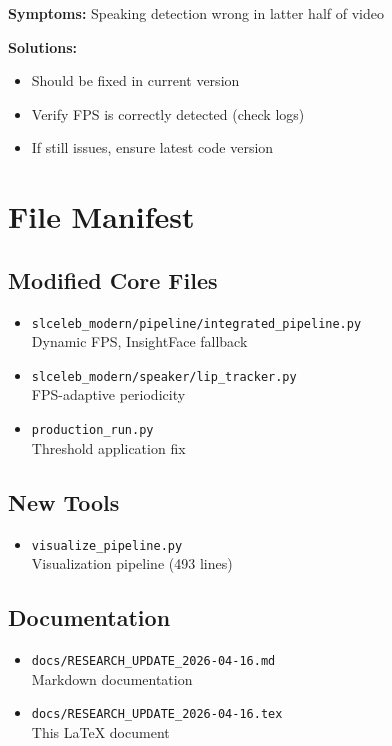 \documentclass[11pt,a4paper]{article}
\begin{document}
\textbf{Symptoms:} Speaking detection wrong in latter half of video

\textbf{Solutions:}
\begin{itemize}
    \item Should be fixed in current version
    \item Verify FPS is correctly detected (check logs)
    \item If still issues, ensure latest code version
\end{itemize}

\section{File Manifest}

\subsection{Modified Core Files}
\begin{itemize}
    \item \texttt{slceleb\_modern/pipeline/integrated\_pipeline.py}\\
    Dynamic FPS, InsightFace fallback
    \item \texttt{slceleb\_modern/speaker/lip\_tracker.py}\\
    FPS-adaptive periodicity
    \item \texttt{production\_run.py}\\
    Threshold application fix
\end{itemize}

\subsection{New Tools}
\begin{itemize}
    \item \texttt{visualize\_pipeline.py}\\
    Visualization pipeline (493 lines)
\end{itemize}

\subsection{Documentation}
\begin{itemize}
    \item \texttt{docs/RESEARCH\_UPDATE\_2026-04-16.md}\\
    Markdown documentation
    \item \texttt{docs/RESEARCH\_UPDATE\_2026-04-16.tex}\\
    This LaTeX document
\end{itemize}
\end{document}
